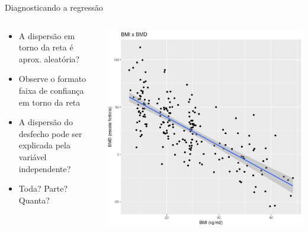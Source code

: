 \documentclass{beamer}
\begin{document}
\begin{frame}{Diagnosticando a regressão}
  \begin{columns}
    \begin{column}{5cm}
      \begin{itemize}
        \small
      \item \alert<2>{A dispersão em torno da reta é aprox. aleatória?}
        \bigskip
      \item Observe o formato faixa de confiança em torno da reta
        \bigskip
        \scriptsize
      \item A dispersão do desfecho pode ser explicada pela variável independente?
      \item Toda? Parte? Quanta?
      \end{itemize}
    \end{column}
    \begin{column}{5cm}
      \begin{center}
        \includegraphics[width=1.1\textwidth]{Cap18-19/pratica-plot2}
      \end{center}
    \end{column}
  \end{columns}
\end{frame}

\end{document}
